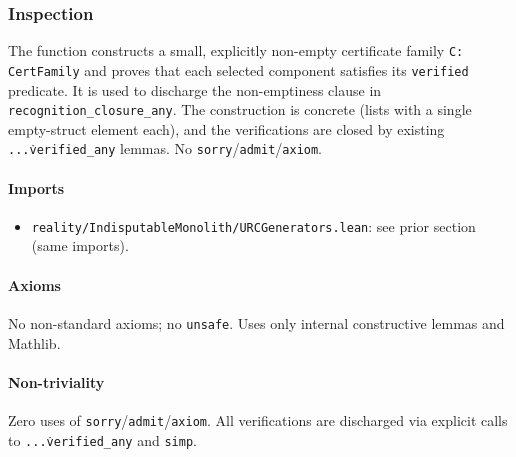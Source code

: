 \documentclass{article}
\newcommand{\FileRef}[1]{\texttt{#1}}
\begin{document}
\subsubsection{Inspection}
The function constructs a small, explicitly non-empty certificate family \texttt{C: CertFamily} and proves that each selected component satisfies its \texttt{verified} predicate. It is used to discharge the non-emptiness clause in \texttt{recognition\_closure\_any}. The construction is concrete (lists with a single empty-struct element each), and the verifications are closed by existing \texttt{...\.verified\_any} lemmas. No \texttt{sorry}/\texttt{admit}/\texttt{axiom}.

\paragraph{Imports}
\begin{itemize}[leftmargin=*]
  \item \FileRef{reality/IndisputableMonolith/URCGenerators.lean}: see prior section (same imports).
\end{itemize}

\paragraph{Axioms}
No non-standard axioms; no \texttt{unsafe}. Uses only internal constructive lemmas and Mathlib.

\paragraph{Non-triviality}
Zero uses of \texttt{sorry}/\texttt{admit}/\texttt{axiom}. All verifications are discharged via explicit calls to \texttt{...\.verified\_any} and \texttt{simp}.
\end{document}

